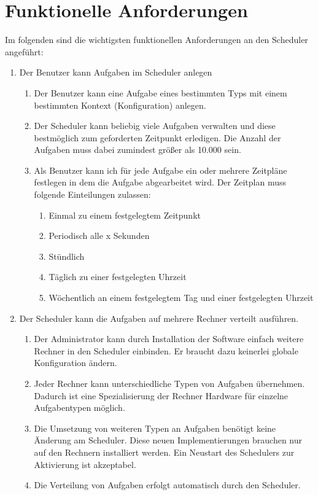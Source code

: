 \section{Funktionelle Anforderungen}
Im folgenden sind die wichtigsten funktionellen Anforderungen an den Scheduler angeführt:
\begin{enumerate}
	\item Der Benutzer kann Aufgaben im Scheduler anlegen
	\begin{enumerate}
		\item Der Benutzer kann eine Aufgabe eines bestimmten Typs mit einem bestimmten Kontext (Konfiguration) anlegen.
		\item Der Scheduler kann beliebig viele Aufgaben verwalten und diese bestmöglich zum geforderten Zeitpunkt erledigen. Die Anzahl der Aufgaben muss dabei zumindest größer als 10.000 sein.
		\item Als Benutzer kann ich für jede Aufgabe ein oder mehrere Zeitpläne festlegen in dem die Aufgabe abgearbeitet wird. Der Zeitplan muss folgende Einteilungen zulassen:
		\begin{enumerate}
			\item Einmal zu einem festgelegtem Zeitpunkt
			\item Periodisch alle x Sekunden
			\item Stündlich
			\item Täglich zu einer festgelegten Uhrzeit
			\item Wöchentlich an einem festgelegtem Tag und einer festgelegten Uhrzeit
		\end{enumerate}
	\end{enumerate}
	\item Der Scheduler kann die Aufgaben auf mehrere Rechner verteilt ausführen.
	\begin{enumerate}
		\item Der Administrator kann durch Installation der Software einfach weitere Rechner in den Scheduler einbinden. Er braucht dazu keinerlei globale Konfiguration ändern.
		\item Jeder Rechner kann unterschiedliche Typen von Aufgaben übernehmen. Dadurch ist eine Spezialisierung der Rechner Hardware für einzelne Aufgabentypen möglich.
		\item Die Umsetzung von weiteren Typen an Aufgaben benötigt keine Änderung am Scheduler. Diese neuen Implementierungen brauchen nur auf den Rechnern installiert werden. Ein Neustart des Schedulers zur Aktivierung ist akzeptabel.
		\item Die Verteilung von Aufgaben erfolgt automatisch durch den Scheduler.

\end{enumerate}
\end{enumerate}
